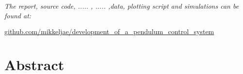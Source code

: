 \vspace{1.2cm}
  \begin{center}
    \textsl{The report, source code, ..... , ..... ,data, plotting script and simulations can be found at:}  
    \end{center}
    \vspace{-5pt}
    \begin{center}
	\renewcommand{\UrlFont}{\color{black}\normalsize\tt}
    \url{github.com/mikkeljae/development_of_a_pendulum_control_system}
   \end{center}
\newpage

\section*{Abstract}
\lipsum[5]

